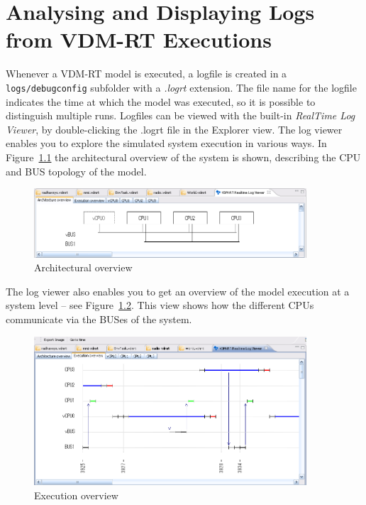 \documentclass{overturerepchap}
\begin{document}
\chapter{Analysing and Displaying Logs from VDM-RT Executions}\label{sec:showlog}

Whenever a VDM-RT model is executed, a logfile is created in
a \texttt{logs/debugconfig} subfolder with a \emph{.logrt} extension. The
file name for the logfile indicates the time at which the model was executed,
so it is possible to distinguish multiple runs. Logfiles can be
viewed with the built-in \emph{RealTime Log Viewer},
by double-clicking the .logrt file in the Explorer view. The log viewer enables
you to explore the simulated system execution in various ways. In
Figure~\ref{fig:userguide:ArchitecturalOverview} the architectural
overview of the system is shown, describing the CPU and BUS topology of
the model.

\begin{figure}[htp]
\begin{center}
  \includegraphics[width=4in]{figures/ArchitectureOverview}
  \caption{Architectural overview}
  \label{fig:userguide:ArchitecturalOverview}
\end{center}
\end{figure}

The log viewer also enables you to get an overview of
the model execution at a system level --
see Figure~\ref{fig:userguide:ExecutionOverview}.
This view shows how the different CPUs communicate via the
BUSes of the system. 

\begin{figure}[htp]
\begin{center}
  \includegraphics[width=4in]{figures/ExecutionOverview}
  \caption{Execution overview}
  \label{fig:userguide:ExecutionOverview}
\end{center}
\end{figure}
\end{document}

